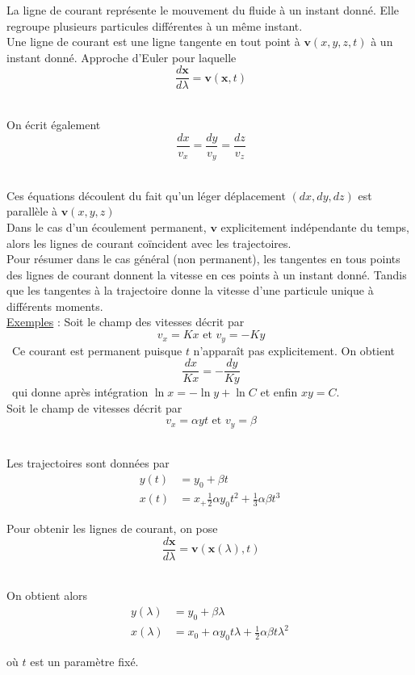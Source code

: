 \documentclass[10pt,a4paper]{book}
\begin{document}
La ligne de courant représente le mouvement du fluide à un instant donné. Elle regroupe plusieurs particules différentes à un même instant.\\
Une ligne de courant est une ligne tangente en tout point à $\mathbf{v}(x,y,z,t)$ à un instant donné. Approche d'Euler pour laquelle \[\ \frac{d \mathbf{x}}{d\lambda}=\mathbf{v}(\mathbf{x},t) \]\

On écrit également \[\ \frac{dx}{v_x}=\frac{dy}{v_y}=\frac{dz}{v_z}\]\

Ces équations découlent du fait qu'un léger déplacement $(dx,dy,dz)$ est parallèle à $\mathbf{v}(x,y,z)$\\

Dans le cas d'un écoulement permanent, $\mathbf{v}$ explicitement indépendante du temps, alors les lignes de courant coïncident avec les trajectoires.\\

Pour résumer dans le cas général (non permanent), les tangentes en tous points des lignes de courant donnent la vitesse en ces points à un instant donné. Tandis que les tangentes à la trajectoire donne la vitesse d'une particule unique à différents moments.\\

\underline{Exemples} : Soit le champ des vitesses décrit par \[\ v_x=Kx \textrm{ et } v_y=-Ky \]\
Ce courant est permanent puisque $t$ n'apparaît pas explicitement. On obtient \[\ \frac{dx}{Kx}=-\frac{dy}{Ky} \]\ qui donne après intégration $\ln x=-\ln y+\ln C$ et enfin $xy=C$.\\

Soit le champ de vitesses décrit par \[\ v_x =\alpha yt \textrm{ et } v_y=\beta \]\

Les trajectoires sont données par
\begin{align*}
y(t)&=y_0+\beta t\\
x(t)&=x_+\frac{1}{2}\alpha y_0t^2+\frac{1}{3}\alpha\beta t^3
\end{align*}

Pour obtenir les lignes de courant, on pose \[\ \frac{d \mathbf{x}}{d\lambda}=\mathbf{v}(\mathbf{x}(\lambda),t) \]\ 

On obtient alors 
\begin{align*}
y(\lambda)&=y_0+\beta \lambda\\
x(\lambda)&=x_0+\alpha y_0 t\lambda + \frac{1}{2}\alpha\beta t \lambda^2
\end{align*}

où $t$ est un paramètre fixé. 
\end{document}
